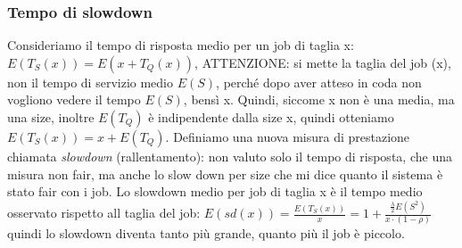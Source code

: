 \documentclass{article}
\begin{document}
\subsubsection{Tempo di slowdown}
Consideriamo il tempo di risposta medio per un job di taglia x: $E(T_S(x)) = E(x + T_Q(x))$, ATTENZIONE: si mette la taglia del job (x), non il tempo di servizio medio $E(S)$, perché dopo aver atteso in coda non vogliono vedere il tempo $E(S)$, bensì x. Quindi, siccome x non è una media, ma una size, inoltre $E(T_Q)$ è indipendente dalla size x, quindi otteniamo $E(T_S(x)) = x + E(T_Q)$. Definiamo una nuova misura di prestazione chiamata \textit{slowdown} (rallentamento): non valuto solo il tempo di risposta, che una misura non fair, ma anche lo slow down per size che mi dice quanto il sistema è stato fair con i job. Lo slowdown medio per job di taglia x è il tempo medio osservato rispetto all taglia del job: $E(sd(x)) = \frac{E(T_S(x))}{x} = 1 + \frac{\frac{\lambda}{2} E(S^2)}{x \cdot (1 - \rho)}$  quindi lo slowdown diventa tanto più grande, quanto più il job è piccolo.
\end{document}
